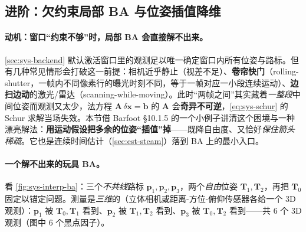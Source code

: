 \subsection{进阶：欠约束局部 BA 与位姿插值降维}
\label{sec:sys-interp-ba}

\paragraph{动机：窗口“约束不够”时，局部 BA 会直接解不出来。}
\cref{sec:sys-backend} 默认激活窗口里的观测足以唯一确定窗口内所有位姿与路标。但有几种常见情形会打破这一前提：相机近乎静止（视差不足）、\textbf{卷帘快门}（rolling-shutter，一帧内不同像素行的曝光时刻不同，等于一帧对应一小段连续运动）、\textbf{边扫边动}的激光/雷达（scanning-while-moving）。此时“两帧之间”其实藏着\emph{一整段}中间位姿而观测又太少，法方程 $\mathbf{A}\,\delta\mathbf{x}=\mathbf{b}$ 的 $\mathbf{A}$ 会\textbf{奇异不可逆}，\cref{eq:sys-schur} 的 Schur 求解当场失效。本节借 Barfoot\cite{barfoot2024state} §10.1.5 的一个小例子讲清这个困境与一种漂亮解法：\textbf{用运动假设把多余的位姿“插值”掉}——既降自由度、又恰好\emph{保住箭头稀疏}。它也是连续时间估计（\cref{sec:est-steam}）落到 BA 上的最小入口。

\paragraph{一个解不出来的玩具 BA。}
看 \cref{fig:sys-interp-ba}：三个\emph{不共线}路标 $\mathbf{p}_1,\mathbf{p}_2,\mathbf{p}_3$，两个\emph{自由}位姿 $\mathbf{T}_1,\mathbf{T}_2$，再把 $\mathbf{T}_0$ 固定以锚定问题。测量是\emph{三维}的（立体相机或距离-方位-俯仰传感器各给一个 3D 观测）：$\mathbf{p}_1$ 被 $\mathbf{T}_0,\mathbf{T}_1$ 看到、$\mathbf{p}_2$ 被 $\mathbf{T}_1,\mathbf{T}_2$ 看到、$\mathbf{p}_3$ 被 $\mathbf{T}_0,\mathbf{T}_2$ 看到——共 $6$ 个 3D 观测（图中 $6$ 个黑点因子）。

